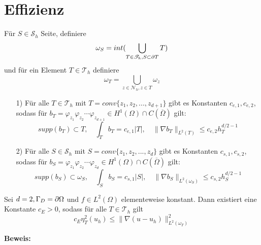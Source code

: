 \section{Effizienz}
\begin{definition}
	Für $S \in \mathscr{S}_h$ Seite, definiere 
	\[
		\omega_S= int(\bigcup_{T\in\mathscr{T}_h,S\subset \partial T}T)
    \]
    und für ein Element $T \in \mathscr{T}_h$ definiere
    \[
    \omega_T = \bigcup_{z\in\mathscr{N}_h,z\in T} \omega_z
    \]
\end{definition}
\begin{lemma}
	\leavevmode
	\begin{itemize}
		\item[1)]
		Für alle $T\in\mathscr{T}_h$ mit $T =conv\{z_1,z_2,...,z_{d+1}\}$ gibt es Konstanten $c_{e,1},c_{e,2}$,  sodass für $b_T = \varphi_{z_1}\varphi_{z_2}\cdots\varphi_{z_{d+1}} \in H^1(\Omega)\cap C(\overline{\Omega})$ gilt:
		\[
		supp(b_T)\subset T,\quad \int_{T} b_T =c_{e,1} |T|, \quad \|\nabla b_T\|_{L^2(T)} \leq c_{e,2}h_T^{d/2-1}
		\]
		\item[2)]
		Für alle $S\in\mathscr{S}_h$ mit $S =conv\{z_1,z_2,...,z_{d}\}$ gibt es Konstanten $c_{s,1},c_{s,2}$,  sodass für $b_S = \varphi_{z_1}\varphi_{z_2}\cdots\varphi_{z_{d}} \in H^1(\Omega)\cap C(\overline{\Omega})$ gilt:
		\[
		supp(b_S)\subset \omega_S,\quad \int_{S} b_S =c_{s,1} |S|, \quad \|\nabla b_S\|_{L^2(\omega_S)} \leq c_{s,2}h_S^{d/2-1}
		\]
	\end{itemize}
\end{lemma}
\begin{theorem}
	Sei $d=2, \Gamma_D = \partial \Omega$ und $f\in L^2(\Omega)$ elementeweise konstant. Dann existiert eine Konstante $c_E > 0$, sodass für alle $T\in\mathscr{T}_h$ gilt
	\[
		c_E \eta_T^2(u_h)\leq \|\nabla (u-u_h)\|^2_{L^2(\omega_T)}
	\] 
\end{theorem}
\textbf{Beweis:}

